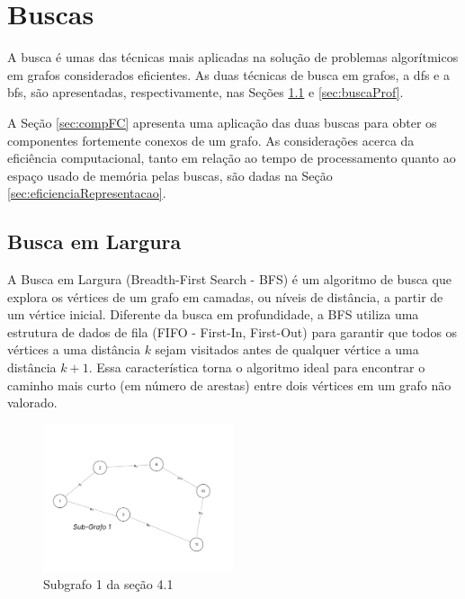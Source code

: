 

\chapter{Buscas}\label{cap:buscas}

A busca é umas das técnicas mais aplicadas na solução de problemas algorítmicos em grafos considerados eficientes. As duas técnicas de busca em grafos, a {dfs} e a {bfs}, são apresentadas, respectivamente, nas Seções \ref{sec:buscaLarg} e \ref{sec:buscaProf}.

A Seção \ref{sec:compFC} apresenta uma aplicação das duas buscas para obter os componentes fortemente conexos de um grafo. As considerações acerca da eficiência computacional, tanto em relação ao tempo de processamento quanto ao espaço usado de memória pelas buscas, são dadas na Seção \ref{sec:eficienciaRepresentacao}.

\section{Busca em Largura}\label{sec:buscaLarg}
A Busca em Largura (Breadth-First Search - BFS) é um algoritmo de busca que explora os vértices de um grafo em camadas, ou níveis de distância, a partir de um vértice inicial. Diferente da busca em profundidade, a BFS utiliza uma estrutura de dados de fila (FIFO - First-In, First-Out) para garantir que todos os vértices a uma distância $k$ sejam visitados antes de qualquer vértice a uma distância $k+1$. Essa característica torna o algoritmo ideal para encontrar o caminho mais curto (em número de arestas) entre dois vértices em um grafo não valorado.

    \begin{figure}[h!]
		\centering
		\includegraphics[width=0.5\textwidth]{figuras/subgrafos/subgrafo1.png}
		\caption{Subgrafo 1 da seção 4.1}
	\end{figure}

